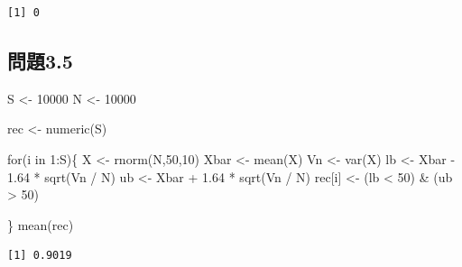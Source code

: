 \documentclass[
  letterpaper,
  DIV=11,
  numbers=noendperiod]{scrartcl}
\newenvironment{Shaded}{\begin{snugshade}}{\end{snugshade}}
\newcommand{\ControlFlowTok}[1]{\textcolor[rgb]{0.00,0.23,0.31}{#1}}
\newcommand{\DecValTok}[1]{\textcolor[rgb]{0.68,0.00,0.00}{#1}}
\newcommand{\FloatTok}[1]{\textcolor[rgb]{0.68,0.00,0.00}{#1}}
\newcommand{\FunctionTok}[1]{\textcolor[rgb]{0.28,0.35,0.67}{#1}}
\newcommand{\NormalTok}[1]{\textcolor[rgb]{0.00,0.23,0.31}{#1}}
\newcommand{\OtherTok}[1]{\textcolor[rgb]{0.00,0.23,0.31}{#1}}
\newcommand{\SpecialCharTok}[1]{\textcolor[rgb]{0.37,0.37,0.37}{#1}}
\begin{document}
\begin{verbatim}
[1] 0
\end{verbatim}

\hypertarget{ux554fux984c3.5}{%
\subsection{問題3.5}\label{ux554fux984c3.5}}

\begin{Shaded}
\begin{Highlighting}[]
\NormalTok{S }\OtherTok{\textless{}{-}} \DecValTok{10000}
\NormalTok{N }\OtherTok{\textless{}{-}} \DecValTok{10000}

\NormalTok{rec }\OtherTok{\textless{}{-}} \FunctionTok{numeric}\NormalTok{(S)}

\ControlFlowTok{for}\NormalTok{(i }\ControlFlowTok{in} \DecValTok{1}\SpecialCharTok{:}\NormalTok{S)\{}
\NormalTok{  X }\OtherTok{\textless{}{-}} \FunctionTok{rnorm}\NormalTok{(N,}\DecValTok{50}\NormalTok{,}\DecValTok{10}\NormalTok{)}
\NormalTok{  Xbar }\OtherTok{\textless{}{-}} \FunctionTok{mean}\NormalTok{(X)}
\NormalTok{  Vn }\OtherTok{\textless{}{-}} \FunctionTok{var}\NormalTok{(X)}
\NormalTok{  lb }\OtherTok{\textless{}{-}}\NormalTok{ Xbar }\SpecialCharTok{{-}} \FloatTok{1.64} \SpecialCharTok{*} \FunctionTok{sqrt}\NormalTok{(Vn }\SpecialCharTok{/}\NormalTok{ N) }
\NormalTok{  ub }\OtherTok{\textless{}{-}}\NormalTok{ Xbar }\SpecialCharTok{+} \FloatTok{1.64} \SpecialCharTok{*} \FunctionTok{sqrt}\NormalTok{(Vn }\SpecialCharTok{/}\NormalTok{ N)}
\NormalTok{  rec[i] }\OtherTok{\textless{}{-}}\NormalTok{ (lb }\SpecialCharTok{\textless{}} \DecValTok{50}\NormalTok{) }\SpecialCharTok{\&}\NormalTok{ (ub }\SpecialCharTok{\textgreater{}} \DecValTok{50}\NormalTok{) }
  
\NormalTok{\}}
\FunctionTok{mean}\NormalTok{(rec)}
\end{Highlighting}
\end{Shaded}

\begin{verbatim}
[1] 0.9019
\end{verbatim}
\end{document}
